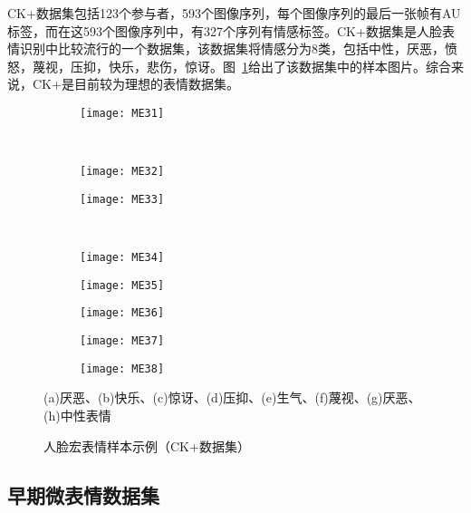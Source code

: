 CK+数据集包括123个参与者，593个图像序列，每个图像序列的最后一张帧有AU标签，而在这593个图像序列中，有327个序列有情感标签。CK+数据集是人脸表情识别中比较流行的一个数据集，该数据集将情感分为8类，包括中性，厌恶，愤怒，蔑视，压抑，快乐，悲伤，惊讶。图~\ref{fig1}给出了该数据集中的样本图片。综合来说，CK+是目前较为理想的表情数据集。

\begin{figure}[!htbp]
    \centering
    \begin{subfigure}[b]{0.22\textwidth}
      \texttt{[image: ME31]}
      \caption{}
    \end{subfigure}%
    ~%
    \begin{subfigure}[b]{0.22\textwidth}
      \texttt{[image: ME32]}
      \caption{}
    \end{subfigure}
    \begin{subfigure}[b]{0.22\textwidth}
      \texttt{[image: ME33]}
      \caption{}
    \end{subfigure}%
    ~%
    \begin{subfigure}[b]{0.22\textwidth}
      \texttt{[image: ME34]}
      \caption{}
    \end{subfigure}
    \begin{subfigure}[b]{0.22\textwidth}
      \texttt{[image: ME35]}
      \caption{}
    \end{subfigure}
    \begin{subfigure}[b]{0.22\textwidth}
      \texttt{[image: ME36]}
      \caption{}
    \end{subfigure}
    \begin{subfigure}[b]{0.22\textwidth}
      \texttt{[image: ME37]}
      \caption{}
    \end{subfigure}
    \begin{subfigure}[b]{0.22\textwidth}
      \texttt{[image: ME38]}
      \caption{}
    \end{subfigure}
    \begin{spacing}{1.0}
    \caption{人脸宏表情样本示例（CK+数据集）}
    \label{fig1}
    \centerline{\footnotesize \textmd{(a)厌恶、(b)快乐、(c)惊讶、(d)压抑、(e)生气、(f)蔑视、(g)厌恶、(h)中性表情}}
    \end{spacing}
\end{figure}

\subsection{早期微表情数据集}

